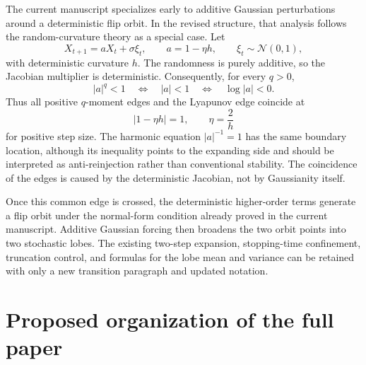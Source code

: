 \documentclass[11pt]{article}
\begin{document}
The current manuscript specializes early to additive Gaussian perturbations around a deterministic flip orbit.  In the revised structure, that analysis follows the random-curvature theory as a special case.  Let
\begin{equation}
    X_{t+1}=aX_t+\sigma\xi_t,
    \qquad a=1-\eta h,
    \qquad \xi_t\sim\mathcal N(0,1),
    \label{eq:ar1}
\end{equation}
with deterministic curvature $h$.  The randomness is purely additive, so the Jacobian multiplier is deterministic.  Consequently, for every $q>0$,
\begin{equation}
    |a|^q<1
    \quad\Longleftrightarrow\quad
    |a|<1
    \quad\Longleftrightarrow\quad
    \log|a|<0.
\end{equation}
Thus all positive $q$-moment edges and the Lyapunov edge coincide at
\begin{equation}
    |1-\eta h|=1,
    \qquad \eta=\frac{2}{h}
\end{equation}
for positive step size.  The harmonic equation $|a|^{-1}=1$ has the same boundary location, although its inequality points to the expanding side and should be interpreted as anti-reinjection rather than conventional stability.  The coincidence of the edges is caused by the deterministic Jacobian, not by Gaussianity itself.

Once this common edge is crossed, the deterministic higher-order terms generate a flip orbit under the normal-form condition already proved in the current manuscript.  Additive Gaussian forcing then broadens the two orbit points into two stochastic lobes.  The existing two-step expansion, stopping-time confinement, truncation control, and formulas for the lobe mean and variance can be retained with only a new transition paragraph and updated notation.

\section{Proposed organization of the full paper}
\end{document}
